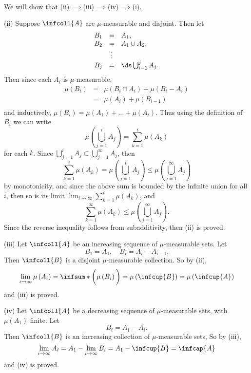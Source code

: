 \documentclass[a5paper]{article}
\makeatletter
\theoremstyle{definition}%
\numberwithin{exercise}{section}
\theoremstyle{remark}%
\renewcommand{\measure}[1]{\mu\left(#1\right)}
\newcommand{\mumeasurable}{$\mu$-measurable}
\renewenvironment{proof}{{Proof.}}{\qed}
\renewenvironment{proof}[1][\proofname.]{\par
  \pushQED{\qed}%
  \normalfont \topsep6\p@\@plus6\p@\relax
  \trivlist
  \item[\hskip\labelsep
        \scshape
    #1\@addpunct{}]\ignorespaces
}{%
  \popQED\endtrivlist\@endpefalse
}
\makeatother
\begin{document}
\begin{proof}
We will show that (ii)$\implies$(iii)$\implies$(iv)$\implies$(i). 

(ii) Suppose $\infcoll{A}$ are \mumeasurable{} and disjoint. Then let 
\[\begin{array}{rcl}
B_1&=&A_1,\\
B_2&=&A_1\cup A_2, \\
&\vdots & \\
B_j&=&\ds\bigcup_{i-1}^j A_j.
\end{array}\]
Then since each $A_i$ is \mumeasurable{}, 
\[\begin{array}{rcl}
\measure{B_i}&=&\measure{B_i\cap A_i} + \measure{B_i-A_i} \\
&=&\measure{A_i} + \measure{B_{i-1}} \\
\end{array}\]
and inductively, $\measure{B_i}=\measure{A_1}+\dots+\measure{A_i}$. Thus using the definition of $B_i$ we can write
$$\measure{\bigcup_{j=1}^i A_j}=\sum_{k=1}^i\measure{A_k}$$
for each $k$. Since $\bigcup\limits_{j=1}^i A_j \subset \bigcup\limits_{j=1}^\infty A_j$, then 
$$\sum_{k=1}^i\measure{A_k}=\measure{\bigcup_{j=1}^i A_j}\leq\measure{\bigcup_{j=1}^\infty A_j}$$
by monotonicity, and since the above sum is bounded by the infinite union for all $i$, then so is its limit 
$\lim_{i\to\infty}\sum\limits_{k=1}^i\measure{A_k}$, and 
$$\sum_{k=1}^\infty\measure{A_k}\leq\measure{\bigcup_{j=1}^\infty A_j}.$$
Since the reverse inequality follows from subadditivity, then (ii) is proved. \qedwhite

(iii) Let $\infcoll{A}$ be an increasing sequence of \mumeasurable{} sets. Let 
$$B_1=A_1, \quad B_i=A_i-A_{i-1}.$$
Then $\infcoll{B}$ is a disjoint \mumeasurable{} collection. So by (ii),
$$\lim_{i\to\infty}\measure{A_i} = \infsum*{\bigg(\measure{B_i}\bigg)} = \measure{\infcup{B}} = \measure{\infcup{A}}$$
and (iii) is proved. \qedwhite

(iv) Let $\infcoll{A}$ be a decreasing sequence of \mumeasurable{} sets, with $\measure{A_1}$ finite. Let 
$$B_i=A_1-A_i.$$
Then $\infcoll{B}$ is an increasing collection of \mumeasurable{} sets, So by (iii), 
$$ \lim_{i\to\infty}A_i = A_1-\lim_{i\to\infty}B_i = A_1 - \infcup{B} = \infcap{A}$$
and (iv) is proved. \qedwhite


\end{proof}
\end{document}
